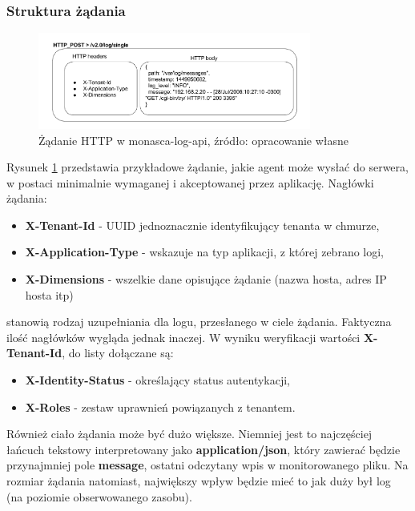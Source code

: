     \subsubsection{Struktura żądania}
    \begin{figure}[h]
        \centering
        \includegraphics[width=0.80\textwidth]{images/monasca_log_api_request}
        \caption[Żądanie HTTP w monasca-log-api]{
             Żądanie HTTP w monasca-log-api, źródło: opracowanie własne
        }
        \label{chapter:monasca:monasca_log_api:request}
    \end{figure}
    Rysunek \ref{chapter:monasca:monasca_log_api:request} przedstawia przykładowe
    żądanie, jakie agent może wysłać do serwera, w postaci minimalnie wymaganej
    i akceptowanej przez aplikację. Nagłówki żądania:
    \begin{itemize}
        \item \textbf{X-Tenant-Id} - UUID jednoznacznie identyfikujący tenanta w chmurze,
        \item \textbf{X-Application-Type} - wskazuje na typ aplikacji, z której zebrano logi,
        \item \textbf{X-Dimensions} - wszelkie dane opisujące żądanie (nazwa hosta, adres IP hosta itp) 
    \end{itemize}
    stanowią rodzaj uzupełniania dla logu, przesłanego w ciele żądania. Faktyczna ilość nagłówków wygląda 
    jednak inaczej. W wyniku weryfikacji wartości \textbf{X-Tenant-Id}, do listy dołączane są:
    \begin{itemize}
        \item \textbf{X-Identity-Status} - określający status autentykacji,
        \item \textbf{X-Roles} - zestaw uprawnień powiązanych z tenantem.
    \end{itemize}
    
    Również ciało żądania może być dużo większe. Niemniej jest to najczęściej łańcuch tekstowy
    interpretowany jako \textbf{application/json}, który zawierać będzie przynajmniej pole \textbf{message},
    ostatni odczytany wpis w monitorowanego pliku. Na rozmiar żądania natomiast, największy wpływ będzie mieć
    to jak duży był log (na poziomie obserwowanego zasobu). 
    
